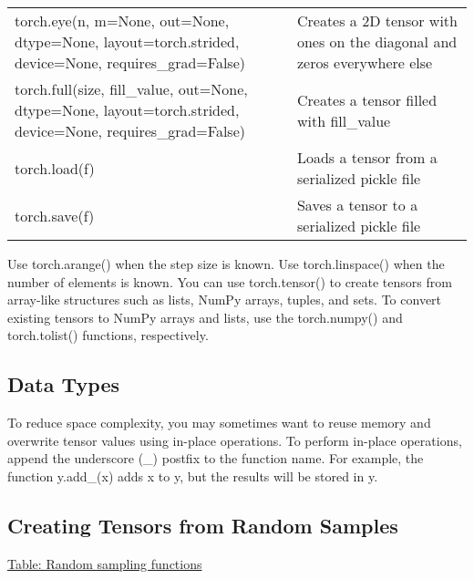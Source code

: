 \begin{table}
\begin{tabularx}{\textwidth}{XX}
        \textsf{torch.eye(n, m=None, out=None, dtype=None, layout=torch.strided, device=None, requires\_grad=False)}                             & Creates a 2D tensor with ones on the diagonal and zeros everywhere else                    \\
        \textsf{torch.full(size, fill\_value, out=None, dtype=None, layout=torch.strided, device=None, requires\_grad=False)}                    & Creates a tensor filled with fill\_value                                                   \\
        \textsf{torch.load(f)}                                                                                                                   & Loads a tensor from a serialized pickle file                                               \\
        \textsf{torch.save(f)}                                                                                                                   & Saves a tensor to a serialized pickle file                                                 \\
        \hline
    \end{tabularx}
\end{table}

Use \textsf{torch.arange()} when the step size is known. Use \textsf{torch.linspace()} when the number of elements is known. You can use \textsf{torch.tensor()} to create tensors from array-like structures such as lists, NumPy arrays, tuples, and
sets. To convert existing tensors to NumPy arrays and lists,
use the \textsf{torch.numpy()} and \textsf{torch.tolist()} functions,
respectively.

\subsection{Data Types}
To reduce space complexity, you may sometimes want to
reuse memory and overwrite tensor values using in-place
operations. To perform in-place operations, append the
underscore (\_) postfix to the function name. For example,
the function \textsf{y.add\_(x)} adds x to y, but the results will be
stored in y.
\subsection{Creating Tensors from Random Samples}
\href{www}{Table: Random sampling functions}
